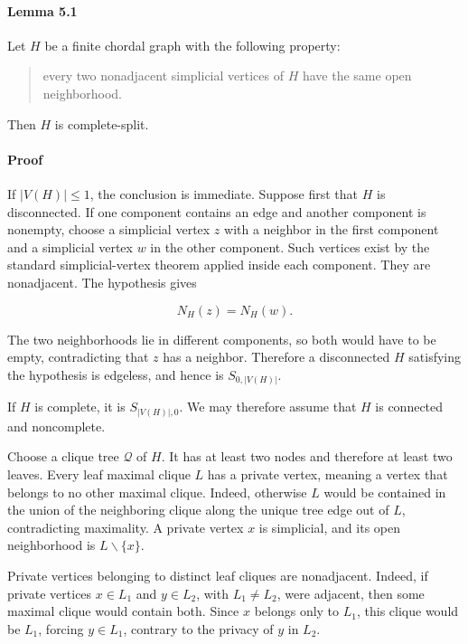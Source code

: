 \documentclass[english,11pt,a4paper]{article}
\newcounter{none}
\begin{document}
\paragraph{Lemma 5.1}\label{lemma-5.1}

Let \(H\) be a finite chordal graph with the following property:

\begin{quote}
every two nonadjacent simplicial vertices of \(H\) have the same open
neighborhood.
\end{quote}

Then \(H\) is complete-split.

\paragraph{Proof}\label{proof-5}

If \(|V(H)|\le1\), the conclusion is immediate. Suppose first that \(H\)
is disconnected. If one component contains an edge and another component
is nonempty, choose a simplicial vertex \(z\) with a neighbor in the
first component and a simplicial vertex \(w\) in the other component.
Such vertices exist by the standard simplicial-vertex theorem applied
inside each component. They are nonadjacent. The hypothesis gives

\[
N_H(z)=N_H(w).
\]

The two neighborhoods lie in different components, so both would have to
be empty, contradicting that \(z\) has a neighbor. Therefore a
disconnected \(H\) satisfying the hypothesis is edgeless, and hence is
\(S_{0,|V(H)|}\).

If \(H\) is complete, it is \(S_{|V(H)|,0}\). We may therefore assume
that \(H\) is connected and noncomplete.

Choose a clique tree \(\mathcal Q\) of \(H\). It has at least two nodes
and therefore at least two leaves. Every leaf maximal clique \(L\) has a
private vertex, meaning a vertex that belongs to no other maximal
clique. Indeed, otherwise \(L\) would be contained in the union of the
neighboring clique along the unique tree edge out of \(L\),
contradicting maximality. A private vertex \(x\) is simplicial, and its
open neighborhood is \(L\backslash\{x\}\).

Private vertices belonging to distinct leaf cliques are nonadjacent.
Indeed, if private vertices \(x\in L_1\) and \(y\in L_2\), with
\(L_1\ne L_2\), were adjacent, then some maximal clique would contain
both. Since \(x\) belongs only to \(L_1\), this clique would be \(L_1\),
forcing \(y\in L_1\), contrary to the privacy of \(y\) in \(L_2\).
\end{document}

